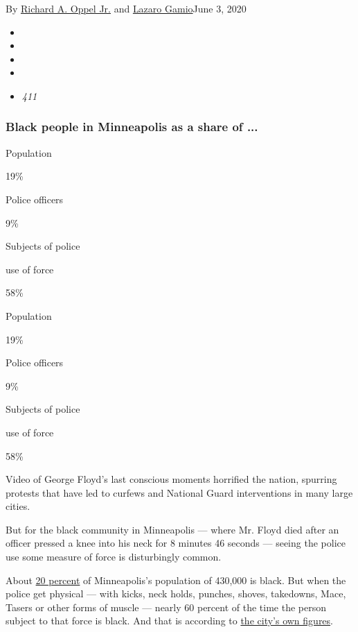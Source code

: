 By
\href{https://www.nytimes3xbfgragh.onion/by/richard-a-oppel-jr}{Richard
A. Oppel Jr.} and
\href{https://www.nytimes3xbfgragh.onion/by/lazaro-gamio}{Lazaro
Gamio}June 3, 2020

\begin{itemize}
\item
\item
\item
\item
\item
  \emph{411}
\end{itemize}

\hypertarget{black-people-in-minneapolis-as-a-share-of-}{%
\subsubsection{Black people in Minneapolis as a share of
...}\label{black-people-in-minneapolis-as-a-share-of-}}

Population

19\%

Police officers

9\%

Subjects of police

use of force

58\%

Population

19\%

Police officers

9\%

Subjects of police

use of force

58\%

Video of George Floyd's last conscious moments horrified the nation,
spurring protests that have led to curfews and National Guard
interventions in many large cities.

But for the black community in Minneapolis --- where Mr. Floyd died
after an officer pressed a knee into his neck for 8 minutes 46 seconds
--- seeing the police use some measure of force is disturbingly common.

About
\href{https://www.census.gov/quickfacts/minneapoliscityminnesota}{20
percent} of Minneapolis's population of 430,000 is black. But when the
police get physical --- with kicks, neck holds, punches, shoves,
takedowns, Mace, Tasers or other forms of muscle --- nearly 60 percent
of the time the person subject to that force is black. And that is
according to
\href{http://opendata.minneapolismn.gov/datasets/police-use-of-force}{the
city's own figures}.

